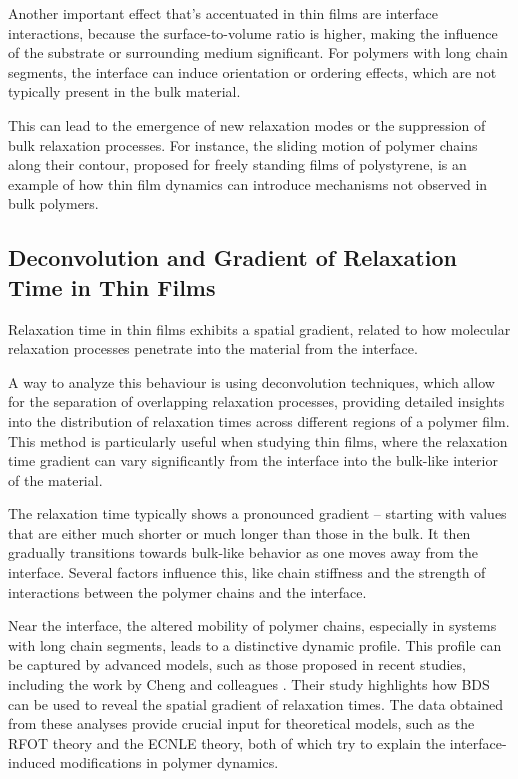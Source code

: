 Another important effect that's accentuated in thin films are interface interactions, because the surface-to-volume ratio is higher, making the influence of the substrate or surrounding medium significant. For polymers with long chain segments, the interface can induce orientation or ordering effects, which are not typically present in the bulk material. %

This can lead to the emergence of new relaxation modes or the suppression of bulk relaxation processes. For instance, the sliding motion of polymer chains along their contour, proposed for freely standing films of polystyrene, is an example of how thin film dynamics can introduce mechanisms not observed in bulk polymers. %


\subsection{Deconvolution and Gradient of Relaxation Time in Thin Films}

Relaxation time in thin films exhibits a spatial gradient, related to how molecular relaxation processes penetrate into the material from the interface.

A way to analyze this behaviour is using deconvolution techniques, which allow for the separation of overlapping relaxation processes, providing detailed insights into the distribution of relaxation times across different regions of a polymer film. This method is particularly useful when studying thin films, where the relaxation time gradient can vary significantly from the interface into the bulk-like interior of the material.

The relaxation time typically shows a pronounced gradient -- starting with values that are either much shorter or much longer than those in the bulk. It then gradually transitions towards bulk-like behavior as one moves away from the interface. Several factors influence this, like chain stiffness and the strength of interactions between the polymer chains and the interface.

Near the interface, the altered mobility of polymer chains, especially in systems with long chain segments, leads to a distinctive dynamic profile. This profile can be captured by advanced models, such as those proposed in recent studies, including the work by Cheng and colleagues \cite{cheng2024}. %
Their study highlights how \ac{BDS} can be used to reveal the spatial gradient of relaxation times. The data obtained from these analyses provide crucial input for theoretical models, such as the \ac{RFOT} theory and the \ac{ECNLE} theory, both of which try to explain the interface-induced modifications in polymer dynamics.

